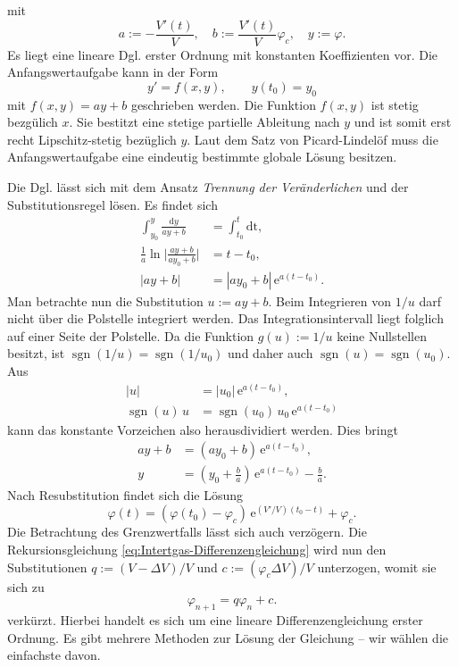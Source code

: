 \documentclass[a4paper,10pt,fleqn,twocolumn,twoside,dvipdfmx]{scrartcl}
\numberwithin{equation}{section}
\newcommand{\ee}{\mathrm e}
\newcommand{\sgn}{\operatorname{sgn}}
\begin{document}
mit
\begin{equation}
a:=-\frac{V'(t)}{V},\quad b:=\frac{V'(t)}{V}\varphi_c,\quad y:=\varphi.
\end{equation}
Es liegt eine lineare Dgl. erster Ordnung mit konstanten
Koeffizienten vor. Die Anfangswertaufgabe kann in der Form%
\begin{equation}
y' = f(x,y),\qquad y(t_0)=y_0
\end{equation}
mit $f(x,y)=ay+b$ geschrieben werden. Die Funktion $f(x,y)$
ist stetig bezgülich $x$. Sie bestitzt eine stetige partielle
Ableitung nach $y$ und ist somit erst recht Lipschitz-stetig
bezüglich $y$. Laut dem Satz von Picard-Lindelöf muss die
Anfangswertaufgabe eine eindeutig bestimmte globale Lösung besitzen.

Die Dgl. lässt sich mit dem Ansatz \emph{Trennung der Veränderlichen}
und der Substitutionsregel lösen. Es findet sich%
\begin{align}
\int_{y_0}^y \frac{\mathrm dy}{ay+b} &= \int_{t_0}^t\mathrm{dt},\\
\frac{1}{a}\ln\Big|\frac{ay+b}{ay_0+b}\Big| &= t-t_0,\\
|ay+b| &= |ay_0+b|\,\ee^{a(t-t_0)}.
\end{align}
Man betrachte nun die Substitution $u:=ay+b$. Beim Integrieren von
$1/u$ darf nicht über die Polstelle integriert werden. Das
Integrationsintervall liegt folglich auf einer Seite der Polstelle.
Da die Funktion $g(u):=1/u$ keine Nullstellen besitzt, ist
$\sgn(1/u)=\sgn(1/u_0)$ und daher auch $\sgn(u)=\sgn(u_0)$. Aus%
\begin{align}
|u| &= |u_0|\,\ee^{a(t-t_0)},\\
\sgn(u)\,u &= \sgn(u_0)\,u_0\,\ee^{a(t-t_0)}
\end{align}
kann das konstante Vorzeichen also herausdividiert werden.
Dies bringt%
\begin{align}
ay+b &= (ay_0+b)\,\ee^{a(t-t_0)},\\
y &= (y_0+\tfrac{b}{a})\,\ee^{a(t-t_0)}-\tfrac{b}{a}.
\end{align}
Nach Resubstitution findet sich die Lösung%
\begin{equation}\label{eq:Volumenanteil-Dgl-Loesung}
\varphi(t) = (\varphi(t_0)-\varphi_c)\,\ee^{(V'/V)(t_0-t)}+\varphi_c.
\end{equation}
Die Betrachtung des Grenzwertfalls lässt sich auch verzögern.
Die Rekursionsgleichung \eqref{eq:Intertgas-Differenzengleichung}
wird nun den Substitutionen $q:=(V-\Delta V)/V$ und
$c:=(\varphi_c\Delta V)/V$ unterzogen, womit sie sich zu%
\begin{equation}
\varphi_{n+1} = q\varphi_n+c.
\end{equation}
verkürzt. Hierbei handelt es sich um eine lineare Differenzengleichung
erster Ordnung. Es gibt mehrere Methoden zur Lösung der Gleichung --
wir wählen die einfachste davon.
\end{document}
